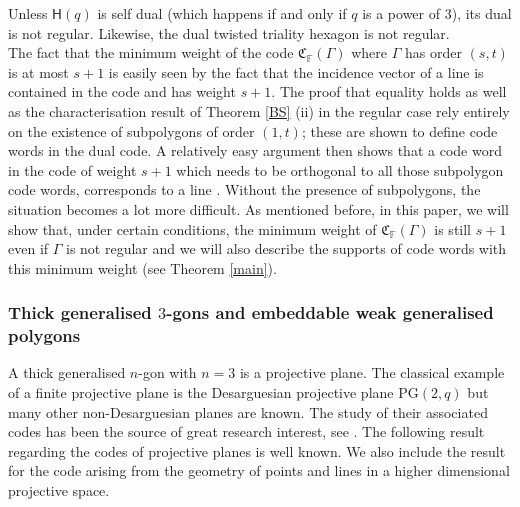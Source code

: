 \documentclass[12pt]{article}
\newcommand{\F}{\mathbb{F}}
\newcommand{\Code}{\mathfrak{C}_\F}
\theoremstyle{remark}
\begin{document}
Unless \(\mathsf{H}(q)\) is self dual (which happens if and only if $q$ is a power of $3$), its dual is not regular. Likewise, the dual twisted triality hexagon is not regular. \\


The fact that the minimum weight of the code \(\Code(\Gamma)\) where $\Gamma$ has order $(s,t)$ is at most $s+1$ is easily seen by the fact that the incidence vector of a line is contained in the code and has weight $s+1$.
The proof that equality holds as well as the characterisation result of Theorem \ref{BS} (ii) in the regular case rely entirely on the existence of subpolygons of order $(1,t)$; these are shown to define code words in the dual code. A relatively easy argument then shows that a code word in the code of weight $s+1$ which needs to be orthogonal to all those subpolygon code words, corresponds to a line \cite[Lemma 2.5]{BandS}. Without the presence of subpolygons, the situation becomes a lot more difficult.
As mentioned before, in this paper, we will show that, under certain conditions, the minimum weight of \(\Code(\Gamma)\) is still \(s+1\) even if \(\Gamma\) is not regular and we will also describe the supports of code words with this minimum weight (see Theorem \ref{main}).


\subsubsection{\texorpdfstring{Thick generalised \(3\)-gons and embeddable weak generalised polygons}{Thick generalised 3-gons and embeddable weak generalised polygons}}
A thick generalised \(n\)-gon with \(n=3\) is a projective plane. The classical example of a finite projective plane is the Desarguesian projective plane \(\text{PG}(2,q)\) but many other non-Desarguesian planes are known. The study of their associated codes has been the source of great research interest, see \cite[Chapter 6]{AssmusAndKey}. The following result regarding the codes of projective planes is well known. We also include the result for the code arising from the geometry of points and lines in a higher dimensional projective space.
\end{document}
